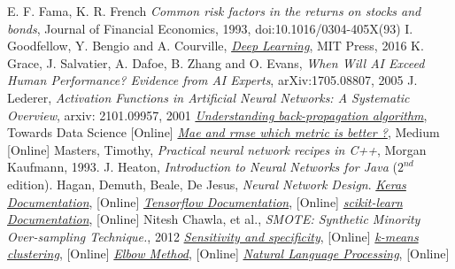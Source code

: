 \begin{thebibliography}{9}
 E. F. Fama, K. R. French \emph{Common risk factors in the returns on stocks and bonds}, Journal of Financial Economics, 1993, doi:10.1016/0304-405X(93)
 I. Goodfellow, Y. Bengio and A. Courville, \href{http://www.deeplearningbook.org}{\emph{Deep Learning}}, MIT Press, 2016
K. Grace, J. Salvatier, A. Dafoe, B. Zhang and O. Evans, \emph{When Will AI Exceed Human Performance? Evidence from AI Experts}, arXiv:1705.08807, 2005
 J. Lederer, \emph{Activation Functions in Artificial Neural Networks: A Systematic Overview}, arxiv: 2101.09957, 2001
\href{https://towardsdatascience.com/understanding-backpropagation-algorithm-7bb3aa2f95fd}{\emph{Understanding back-propagation algorithm}}, Towards Data Science [Online]
\href{https://medium.com/human-in-a-machine-world/mae-and-rmse-which-metric-is-better-e60ac3bde13d}{\emph{Mae and rmse which metric is better ?}}, Medium [Online]
 Masters, Timothy, \emph{Practical neural network recipes in C++}, Morgan Kaufmann, 1993.
 J. Heaton, \emph{Introduction to Neural Networks for Java} ($2^{nd}$ edition).
 Hagan, Demuth, Beale, De Jesus, \emph{Neural Network Design}.
\href{https://keras.io/}{\emph{Keras Documentation}}, [Online]  
\href{https://www.tensorflow.org/}{\emph{Tensorflow Documentation}}, [Online] 
\href{https://scikit-learn.org/stable/}{\emph{scikit-learn Documentation}}, [Online]
Nitesh Chawla, et al., \emph{SMOTE: Synthetic Minority Over-sampling Technique.}, 2012
\href{https://en.wikipedia.org/wiki/Sensitivity_and_specificity}{\emph{Sensitivity and specificity}}, [Online]
\href{https://en.wikipedia.org/wiki/K-means_clustering}{\emph{k-means clustering}}, [Online]
\href{https://en.wikipedia.org/wiki/Elbow_method_(clustering)}{\emph{Elbow Method}}, [Online]
\href{https://www.ibm.com/cloud/learn/natural-language-processing}{\emph{Natural Language Processing}}, [Online]

\end{thebibliography}
